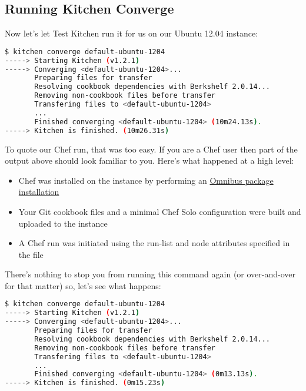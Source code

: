 \subsection{Running Kitchen Converge}

Now let's let Test Kitchen run it for us on our Ubuntu 12.04 instance:

\begin{lstlisting}[language=Bash,label=lst:testing-test-kitchen9]
$ kitchen converge default-ubuntu-1204
-----> Starting Kitchen (v1.2.1)
-----> Converging <default-ubuntu-1204>...
       Preparing files for transfer
       Resolving cookbook dependencies with Berkshelf 2.0.14...
       Removing non-cookbook files before transfer
       Transfering files to <default-ubuntu-1204>
       ...
       Finished converging <default-ubuntu-1204> (10m24.13s).
-----> Kitchen is finished. (10m26.31s)
\end{lstlisting}

To quote our Chef run, that was too easy. If you are a Chef user then part of the output above should look familiar to you. Here's what happened at a high level:

\begin{itemize}
  \item Chef was installed on the instance by performing an \href{http://www.opscode.com/chef/install/}{Omnibus package installation}
  \item Your Git cookbook files and a minimal Chef Solo configuration were built and uploaded to the instance
  \item A Chef run was initiated using the run-list and node attributes specified in the  file
\end{itemize}

There's nothing to stop you from running this command again (or over-and-over for that matter) so, let's see what happens:

\begin{lstlisting}[language=Bash,label=lst:testing-test-kitchen10]
$ kitchen converge default-ubuntu-1204
-----> Starting Kitchen (v1.2.1)
-----> Converging <default-ubuntu-1204>...
       Preparing files for transfer
       Resolving cookbook dependencies with Berkshelf 2.0.14...
       Removing non-cookbook files before transfer
       Transfering files to <default-ubuntu-1204>
       ...
       Finished converging <default-ubuntu-1204> (0m13.13s).
-----> Kitchen is finished. (0m15.23s)
\end{lstlisting}

